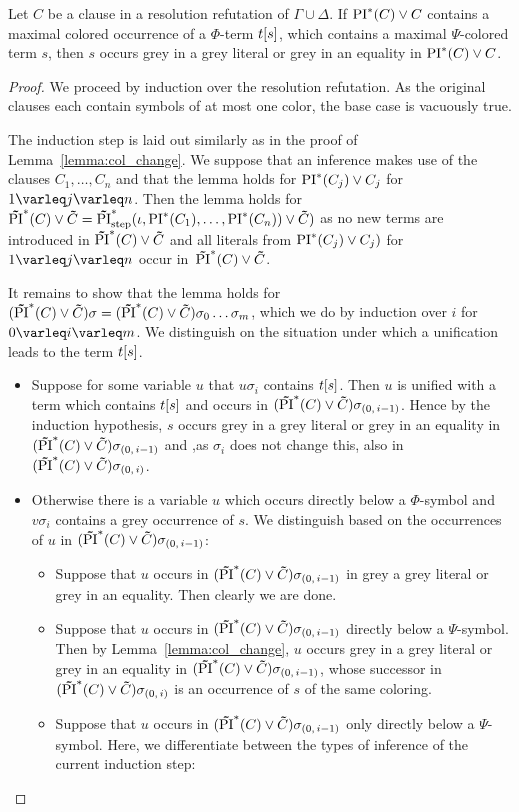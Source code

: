 \documentclass[%
	draft=false,%
	numbers=noendperiod,%
	11pt,%
	a4paper,%
	oneside,%
	openany,%
]{memoir}
\begin{document}
\begin{lemma}
	\label{lemma:subterm_in_grey_lit_star}
	Let $C$ be a clause in a resolution refutation of $\Gamma \cup \Delta$.
	If $\operatorname{PI}^*(C) \lor C$ contains a maximal colored occurrence of a $\Phi$-term $t[s]$, which contains a maximal $\Psi$-colored term $s$, then $s$ occurs grey in a grey literal or grey in an equality in $\operatorname{PI}^*(C) \lor C$.
\end{lemma}
\begin{proof}
	We proceed by induction over the resolution refutation.
	As the original clauses each contain symbols of at most one color, the base case is vacuously true.

	The induction step is laid out similarly as in the proof of Lemma~\ref{lemma:col_change}. 
	We suppose that an inference makes use of the clauses $C_1, \dots, C_n$ and that the lemma holds for $\operatorname{PI}^*(C_j) \lor C_j$ for $1\varleq j \varleq n$. 
	Then the lemma holds for $\bm\tilde{\operatorname{PI}}^{*}(C)\lor \bm\tilde{C} = \bm\tilde{\operatorname{PI}}^{*}_{\mathrm{step}}(\iota, \operatorname{PI}^*(C_1), \dots, \operatorname{PI}^*(C_n)) \lor \bm\tilde{C})$ as no new terms are introduced in $\bm\tilde{\operatorname{PI}}^{*}(C)\lor \bm\tilde{C}$ and all literals from $\operatorname{PI}^*(C_j) \lor C_j)$ for $1\varleq j \varleq n$ occur in~$\bm\tilde{\operatorname{PI}}^{*}(C)\lor \bm\tilde{C}$.

	It remains to show that the lemma holds for $(\bm\tilde{\operatorname{PI}}^{*}(C)\lor \bm\tilde{C})\sigma = (\bm\tilde{\operatorname{PI}}^{*}(C)\lor \bm\tilde{C})\sigma_0 \dots \sigma_m$, which we do by induction over $i$ for $0 \varleq i \varleq m$.
	We distinguish on the situation under which a unification leads to the term $t[s]$.

	\begin{itemize}
		\item 
			Suppose for some variable $u$ that $u\sigma_i$ contains $t[s]$. 
			Then $u$ is unified with a term which contains $t[s]$ and occurs in $(\bm\tilde{\operatorname{PI}}^{*}(C)\lor \bm\tilde{C})\sigma_{(0,\,i-1)}$.
			Hence by the induction hypothesis, $s$ occurs grey in a grey literal or grey in an equality in $(\bm\tilde{\operatorname{PI}}^{*}(C)\lor \bm\tilde{C})\sigma_{(0,\,i-1)}$ and ,as $\sigma_i$ does not change this, also in $(\bm\tilde{\operatorname{PI}}^{*}(C)\lor \bm\tilde{C})\sigma_{(0,\,i)}$.

		\item 
			Otherwise there is a variable $u$ which occurs directly below a $\Phi$-symbol and $v\sigma_i$ contains a grey occurrence of $s$.
			We distinguish based on the occurrences of $u$ in $(\bm\tilde{\operatorname{PI}}^{*}(C)\lor \bm\tilde{C})\sigma_{(0,\,i-1)}$:

			\begin{itemize}
				\item Suppose that $u$ occurs in $(\bm\tilde{\operatorname{PI}}^{*}(C)\lor \bm\tilde{C})\sigma_{(0,\,i-1)}$ in grey a grey literal or grey in an equality. Then clearly we are done.
				\item Suppose that $u$ occurs in $(\bm\tilde{\operatorname{PI}}^{*}(C)\lor \bm\tilde{C})\sigma_{(0,\,i-1)}$ directly below a $\Psi$-symbol.
					Then by Lemma~\ref{lemma:col_change}, $u$ occurs grey in a grey literal or grey in an equality in $(\bm\tilde{\operatorname{PI}}^{*}(C)\lor \bm\tilde{C})\sigma_{(0,\,i-1)}$, whose successor in $(\bm\tilde{\operatorname{PI}}^{*}(C)\lor \bm\tilde{C})\sigma_{(0,\,i)}$ is an occurrence of $s$ of the same coloring.
				\item Suppose that $u$ occurs in $(\bm\tilde{\operatorname{PI}}^{*}(C)\lor \bm\tilde{C})\sigma_{(0,\,i-1)}$ only directly below a $\Psi$-symbol.
					Here, we differentiate between the types of inference of the current induction step:


\end{itemize}
\end{itemize}
\end{proof}
\end{document}
